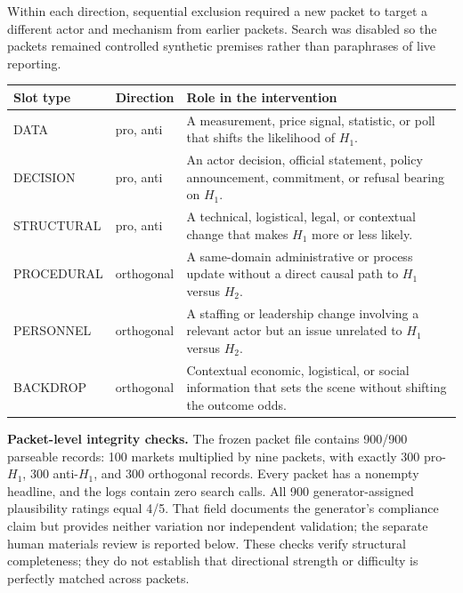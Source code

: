 Within each direction, sequential exclusion required a new packet to target a different
actor and mechanism from earlier packets.  Search was disabled so the packets remained
controlled synthetic premises rather than paraphrases of live reporting.

\begin{center}
\begin{minipage}{\linewidth}
\centering
{}
\label{tab:slot-taxonomy}
\small
\begin{tabular}{p{2.5cm} p{1.8cm} p{7.5cm}}
\toprule
\textbf{Slot type} & \textbf{Direction} & \textbf{Role in the intervention} \\
\midrule
DATA        & pro, anti & A measurement, price signal, statistic, or poll that
               shifts the likelihood of $H_1$. \\
DECISION    & pro, anti & An actor decision, official statement, policy announcement,
               commitment, or refusal bearing on $H_1$. \\
STRUCTURAL  & pro, anti & A technical, logistical, legal, or contextual change that
               makes $H_1$ more or less likely. \\
PROCEDURAL  & orthogonal & A same-domain administrative or process update without a
               direct causal path to $H_1$ versus $H_2$. \\
PERSONNEL   & orthogonal & A staffing or leadership change involving a relevant actor
               but an issue unrelated to $H_1$ versus $H_2$. \\
BACKDROP    & orthogonal & Contextual economic, logistical, or social information that
               sets the scene without shifting the outcome odds. \\
\bottomrule
\end{tabular}
\end{minipage}
\end{center}

\noindent\textbf{Packet-level integrity checks.}
The frozen packet file contains 900/900 parseable records: 100 markets multiplied by
nine packets, with exactly 300 pro-$H_1$, 300 anti-$H_1$, and 300 orthogonal records.
Every packet has a nonempty headline, and the logs contain zero search calls.  All 900
generator-assigned plausibility ratings equal 4/5. That field documents the
generator's compliance claim but provides neither variation nor independent
validation; the separate human materials review is reported below.
These checks verify structural completeness; they do not establish that directional
strength or difficulty is perfectly matched across packets.

